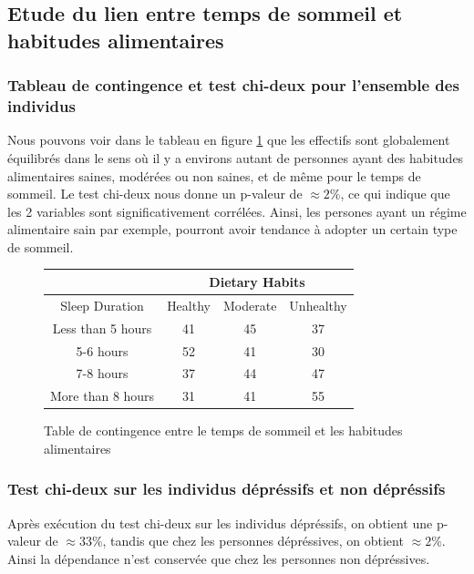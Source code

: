 \subsection{Etude du lien entre temps de sommeil et habitudes alimentaires}

\subsubsection{Tableau de contingence et test chi-deux pour l'ensemble des individus}

Nous pouvons voir dans le tableau en figure \ref{tab:contTableDietarySleepAll} que les effectifs sont globalement équilibrés dans le sens où il y a environs autant de personnes ayant des habitudes alimentaires saines, modérées ou non saines, et de même pour le temps de sommeil. 
Le test chi-deux nous donne un p-valeur de $\approx 2\%$, ce qui indique que les 2 variables sont significativement corrélées. Ainsi, les persones ayant un régime alimentaire sain par exemple, pourront avoir tendance à adopter un certain type de sommeil.

\begin{figure}[!h]
    \begin{center}
      \begin{tabular}{|c|c|c|c|}
        \hline 
        & \multicolumn{3}{|c|}{Dietary Habits}\\ 
        \hline
        Sleep Duration & Healthy & Moderate & Unhealthy\\
        \hline 
        Less than 5 hours & 41 & 45 & 37 \\ 
        \hline 
        5-6 hours & 52 & 41 & 30\\
        \hline 
        7-8 hours & 37 & 44 & 47\\
        \hline 
        More than 8 hours & 31 & 41 & 55\\
        \hline
      \end{tabular}
    \end{center}
    \caption{Table de contingence entre le temps de sommeil et les habitudes alimentaires}
    \label{tab:contTableDietarySleepAll}
\end{figure}  

\subsubsection{Test chi-deux sur les individus dépréssifs et non dépréssifs}

Après exécution du test chi-deux sur les individus dépréssifs, on obtient une p-valeur de $\approx 33\%$, tandis que chez les personnes dépréssives, on obtient $\approx 2\%$. Ainsi la dépendance n'est conservée que chez les personnes non dépréssives. 

